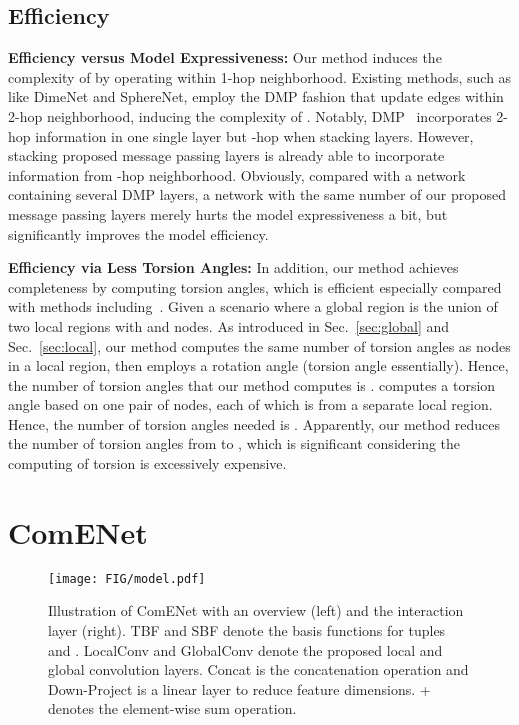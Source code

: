 \documentclass{article}
\begin{document}
\subsection{Efficiency}  \label{sec:effi}
\textbf{Efficiency versus Model Expressiveness:} Our method induces the complexity of  by operating within 1-hop neighborhood.
Existing methods, such as like DimeNet and SphereNet, employ the DMP fashion that update edges
within 2-hop neighborhood, inducing the complexity of .
Notably, DMP~\citep{stokes2020deep,yang2019analyzing,klicpera_dimenet_2020, liu2022spherical} incorporates
2-hop information in one single layer but -hop when stacking  layers.
However,
stacking  proposed message passing layers is already able to incorporate information from -hop neighborhood.
Obviously, compared with a network containing several DMP layers, a network with the same number of our
proposed message passing layers merely hurts the model expressiveness a bit, but
significantly improves the model efficiency.

\textbf{Efficiency via Less Torsion Angles:}
In addition, our method achieves completeness by
computing  torsion angles, which is efficient especially 
compared with methods including~\citet{klicpera2021gemnet,adams2022learning,ganea2021geomol}.
Given a scenario where a global region is the union of two local regions with  and  nodes.
As introduced in Sec.~\ref{sec:global} and Sec.~\ref{sec:local}, our method computes the same number of torsion angles as nodes in a local region,
then employs a rotation angle (torsion angle essentially). Hence, the number of torsion angles that our method computes is .
\citet{ganea2021geomol} computes a torsion angle
based on one pair of nodes, each of which is from a separate local region.
Hence, the number of torsion angles needed is .
Apparently, our method reduces the number of torsion angles from  to ,
which is significant considering the computing of torsion is excessively expensive.

\section{ComENet} \label{sec:network}

\begin{wrapfigure}[22]{r}{0.6\textwidth}\vspace{-25 pt}
    \centering
    \texttt{[image: FIG/model.pdf]}
    \vspace{-18 pt}
    \caption{Illustration of ComENet with an overview (left) and the interaction layer (right).
    TBF and SBF denote the basis functions for tuples  and .
    LocalConv and GlobalConv denote the proposed local and global convolution layers.
    Concat is the concatenation operation and Down-Project is a linear layer to reduce feature dimensions.
    + denotes the element-wise sum operation.
    }\label{fig:model}
    \vspace{-20 pt}
\end{wrapfigure}
\end{document}
